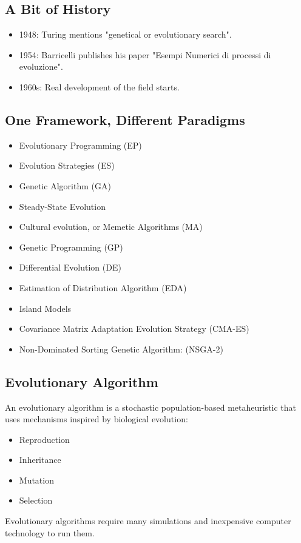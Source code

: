 \subsection*{A Bit of History}
\begin{itemize}
    \item  1948: Turing mentions "genetical or evolutionary search".
    \item 1954: Barricelli publishes his paper "Esempi Numerici di processi di evoluzione".
    \item 1960s: Real development of the field starts.
\end{itemize}

\subsection*{One Framework, Different Paradigms}
\begin{itemize}
    \item Evolutionary Programming (EP)
    \item Evolution Strategies (ES)
    \item Genetic Algorithm (GA)
    \item Steady-State Evolution
    \item Cultural evolution, or Memetic Algorithms (MA)
    \item Genetic Programming (GP)
    \item Differential Evolution (DE)
    \item Estimation of Distribution Algorithm (EDA)
    \item Island Models
     \item Covariance Matrix Adaptation Evolution Strategy (CMA-ES)
    \item Non-Dominated Sorting Genetic Algorithm: (NSGA-2)
\end{itemize}

\subsection*{Evolutionary Algorithm}
An evolutionary algorithm is a stochastic population-based metaheuristic that uses mechanisms inspired by biological evolution:
\begin{itemize}
    \item Reproduction
    \item Inheritance
    \item Mutation
    \item Selection
\end{itemize}
Evolutionary algorithms require many simulations and inexpensive computer technology to run them.


